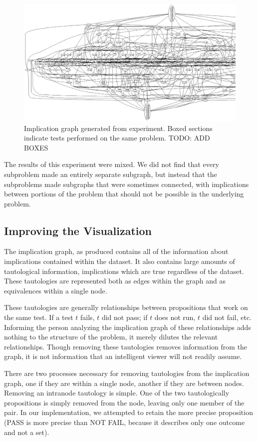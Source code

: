 \documentclass[11pt,twoside]{article}
\begin{document}
\begin{figure}
\includegraphics[scale=0.5]{div.ps}
\caption{Implication graph generated from experiment. Boxed sections indicate tests performed on the same problem. TODO: ADD BOXES}
\end{figure}

The results of this experiment were mixed. We did not find that every subproblem made an entirely separate subgraph, but instead that the subproblems made subgraphs that were sometimes connected, with implications between portions of the problem that should not be possible in the underlying problem.

\subsection{Improving the Visualization}
The implication graph, as produced contains all of the information about implications contained within the dataset. It also contains large amounts of tautological information, implications which are true regardless of the dataset. These tautologies are represented both as edges within the graph and as equivalences within a single node.

These tautologies are generally relationships between propositions that work on the same test. If a test $t$ fails, $t$ did not pass; if $t$ does not run, $t$ did not fail, etc. Informing the person analyzing the implication graph of these relationships adds nothing to the structure of the problem, it merely dilutes the relevant relationships. Though removing these tautologies removes information from the graph, it is not information that an intelligent viewer will not readily assume.

There are two processes necessary for removing tautologies from the implication graph, one if they are within a single node, another if they are between nodes. Removing an intranode tautology is simple. One of the two tautologically propositions is simply removed from the node, leaving only one member of the pair. In our implementation, we attempted to retain the more precise proposition (PASS is more precise than NOT FAIL, because it describes only one outcome and not a set). 
\end{document}
